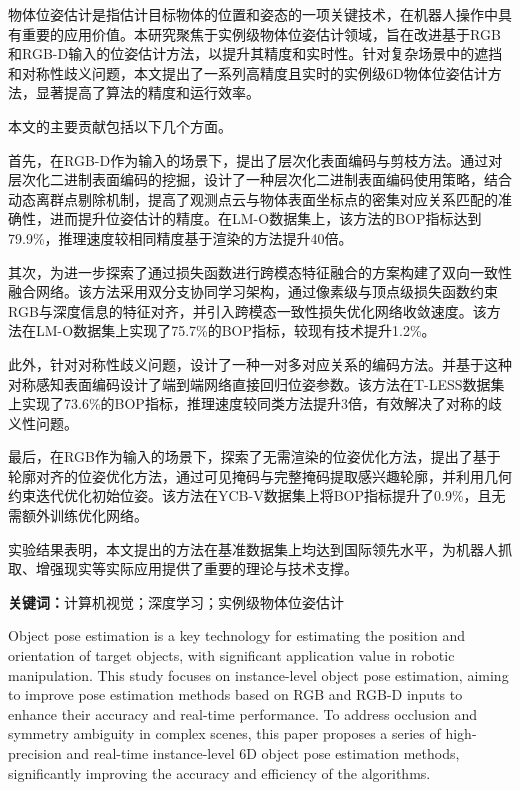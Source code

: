 \cleardoublepage
{}
\par 物体位姿估计是指估计目标物体的位置和姿态的一项关键技术，在机器人操作中具有重要的应用价值。本研究聚焦于实例级物体位姿估计领域，旨在改进基于RGB和RGB-D输入的位姿估计方法，以提升其精度和实时性。针对复杂场景中的遮挡和对称性歧义问题，本文提出了一系列高精度且实时的实例级6D物体位姿估计方法，显著提高了算法的精度和运行效率。
\par 本文的主要贡献包括以下几个方面。
\par 首先，在RGB-D作为输入的场景下，提出了层次化表面编码与剪枝方法。通过对层次化二进制表面编码的挖掘，设计了一种层次化二进制表面编码使用策略，结合动态离群点剔除机制，提高了观测点云与物体表面坐标点的密集对应关系匹配的准确性，进而提升位姿估计的精度。在LM-O数据集上，该方法的BOP指标达到79.9\%，推理速度较相同精度基于渲染的方法提升40倍。
\par 其次，为进一步探索了通过损失函数进行跨模态特征融合的方案构建了双向一致性融合网络。该方法采用双分支协同学习架构，通过像素级与顶点级损失函数约束RGB与深度信息的特征对齐，并引入跨模态一致性损失优化网络收敛速度。该方法在LM-O数据集上实现了75.7\%的BOP指标，较现有技术提升1.2\%。
\par 此外，针对对称性歧义问题，设计了一种一对多对应关系的编码方法。并基于这种对称感知表面编码设计了端到端网络直接回归位姿参数。该方法在T-LESS数据集上实现了73.6\%的BOP指标，推理速度较同类方法提升3倍，有效解决了对称的歧义性问题。
\par 最后，在RGB作为输入的场景下，探索了无需渲染的位姿优化方法，提出了基于轮廓对齐的位姿优化方法，通过可见掩码与完整掩码提取感兴趣轮廓，并利用几何约束迭代优化初始位姿。该方法在YCB-V数据集上将BOP指标提升了0.9\%，且无需额外训练优化网络。
\par 实验结果表明，本文提出的方法在基准数据集上均达到国际领先水平，为机器人抓取、增强现实等实际应用提供了重要的理论与技术支撑。
\par \textbf{关键词：}计算机视觉；深度学习；实例级物体位姿估计
\cleardoublepage
{}
\par Object pose estimation is a key technology for estimating the position and orientation of target objects, with significant application value in robotic manipulation. This study focuses on instance-level object pose estimation, aiming to improve pose estimation methods based on RGB and RGB-D inputs to enhance their accuracy and real-time performance. To address occlusion and symmetry ambiguity in complex scenes, this paper proposes a series of high-precision and real-time instance-level 6D object pose estimation methods, significantly improving the accuracy and efficiency of the algorithms.

